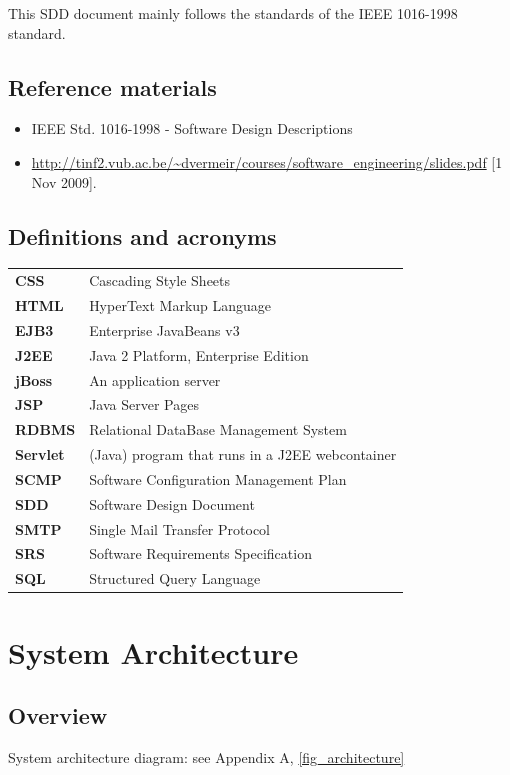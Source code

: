 \documentclass[a4paper, 12pt]{report}
\begin{document}
This SDD document mainly follows the standards of the IEEE 1016-1998 standard.

\section{Reference materials}
\begin{itemize}
\item IEEE Std. 1016-1998 - Software Design Descriptions
\item \url{http://tinf2.vub.ac.be/~dvermeir/courses/software_engineering/slides.pdf} [1 Nov 2009].
\end{itemize}

\section{Definitions and acronyms \label{acronyms}}
\begin{tabular}{ll}
\textbf{CSS}   & Cascading Style Sheets \\
\textbf{HTML}   & HyperText Markup Language \\
\textbf{EJB3}   & Enterprise JavaBeans v3 \\
\textbf{J2EE}   & Java 2 Platform, Enterprise Edition \\
\textbf{jBoss}   & An application server \\
\textbf{JSP}   & Java Server Pages \\
\textbf{RDBMS}    & Relational DataBase Management System \\
\textbf{Servlet}   & (Java) program that runs in a J2EE webcontainer  \\
\textbf{SCMP}   & Software Configuration Management Plan \\
\textbf{SDD}    & Software Design Document \\
\textbf{SMTP}   & Single Mail Transfer Protocol \\
\textbf{SRS}    & Software Requirements Specification \\
\textbf{SQL}   & Structured Query Language \\
\end{tabular}

\pagebreak
\chapter{System Architecture}
\section{Overview}
System architecture diagram: see Appendix A, \ref{fig_architecture}
\end{document}
